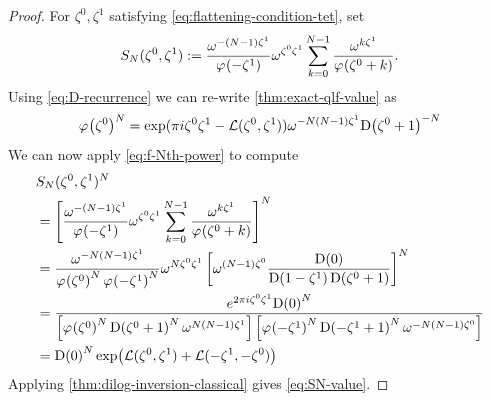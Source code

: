\documentclass{sl2ams}
\numberwithin{equation}{section}
\begin{document}
\begin{proof}
  For \(\zeta^{0}, \zeta^{1}\) satisfying \eqref{eq:flattening-condition-tet}, set
  \begin{equation*}
    S_{\nr}(\zeta^{0}, \zeta^{1})
    \defeq
    \frac{
      \omega^{-(\nr-1) \zeta^{1}}
    }{
      \pf{-\zeta^{1}} 
    }
    \omega^{\zeta^{0} \zeta^{1}}
    \sum_{k = 0}^{\nr -1}
    \frac{
      \omega^{k \zeta^{1}}
    }{
      \pf{\zeta^{0} + k} 
    }
    .
  \end{equation*}
  Using \eqref{eq:D-recurrence} we can re-write \cref{thm:exact-qlf-value} as
  \[
    \pf{\zeta^{0}}^{\nr}
    =
    \exp(\pi i \zeta^{0} \zeta^{1} -\dilr(\zeta^{0}, \zeta^{1}))
    \omega^{-\nr(\nr -1)\zeta^{1}} \df{\zeta^{0} + 1}^{-\nr}
  \]
  We can now apply \cref{eq:f-Nth-power} to compute
  \begin{align*}
    &S_{\nr}(\zeta^{0}, \zeta^{1})^{\nr}
    \\
    &=
    \left[
    \frac{
      \omega^{-(\nr-1) \zeta^{1}}
      }{
      \pf{-\zeta^{1}} 
    }
    \omega^{\zeta^{0} \zeta^{1}}
    \sum_{k = 0}^{\nr -1}
    \frac{
      \omega^{k \zeta^{1}}
      }{
      \pf{\zeta^{0} + k} 
    }
    \right]^{\nr}
    \\
    &=
    \frac{
      \omega^{-\nr(\nr - 1)\zeta^{1}}
    }{
      \pf{\zeta^{0}}^{\nr} 
      \pf{-\zeta^{1}}^{\nr} 
    }
    \omega^{\nr \zeta^{0} \zeta^{1}}
    \left[
      \omega^{(\nr-1)\zeta^{0}}
      \frac{
        \df{0}
      }{
        \df{1 - \zeta^{1}}
        \df{\zeta^{0} + 1}
      }
    \right]^{\nr}
    \\
    &=
    \frac{
      e^{2 \pi i \zeta^{0} \zeta^{1}}
      \df{0}^{\nr}
    }{
      \left[
        \pf{\zeta^{0}}^{\nr}
        \df{\zeta^{0} + 1}^{\nr}
        \omega^{\nr (\nr -1) \zeta^{1}}
      \right]
      \left[
        \pf{-\zeta^{1}}^{\nr}
        \df{-\zeta^{1} + 1}^{\nr}
        \omega^{-\nr (\nr -1) \zeta^{0}}
      \right]
    }
    \\
    &=
    \df{0}^{\nr}
    \exp \leftfun(
      \dilr(\zeta^{0} , \zeta^{1})
      +
      \dilr(-\zeta^{1} , -\zeta^{0})
    \rightfun)
  \end{align*}
  Applying \cref{thm:dilog-inversion-classical} gives \eqref{eq:SN-value}.


\end{proof}
\end{document}
